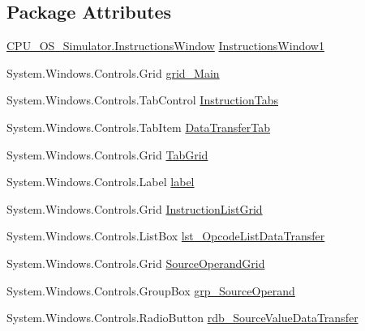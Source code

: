 \subsection*{Package Attributes}
\begin{DoxyCompactItemize}
\item 
\hyperlink{class_c_p_u___o_s___simulator_1_1_instructions_window}{C\+P\+U\+\_\+\+O\+S\+\_\+\+Simulator.\+Instructions\+Window} \hyperlink{class_c_p_u___o_s___simulator_1_1_instructions_window_ab7cd84f5ba064256327f6b1b1cdbc525}{Instructions\+Window1}
\item 
System.\+Windows.\+Controls.\+Grid \hyperlink{class_c_p_u___o_s___simulator_1_1_instructions_window_a83e86d19573c6c56db33e047354169a1}{grid\+\_\+\+Main}
\item 
System.\+Windows.\+Controls.\+Tab\+Control \hyperlink{class_c_p_u___o_s___simulator_1_1_instructions_window_a2e3784c64a40e14586270c1ebfe8bf3d}{Instruction\+Tabs}
\item 
System.\+Windows.\+Controls.\+Tab\+Item \hyperlink{class_c_p_u___o_s___simulator_1_1_instructions_window_a1076ccccc5b00e3f34ad487bc99b509b}{Data\+Transfer\+Tab}
\item 
System.\+Windows.\+Controls.\+Grid \hyperlink{class_c_p_u___o_s___simulator_1_1_instructions_window_a8e5436d90df63837c7f39586855bda1b}{Tab\+Grid}
\item 
System.\+Windows.\+Controls.\+Label \hyperlink{class_c_p_u___o_s___simulator_1_1_instructions_window_a71ce6968170dda46d83aefc71b63a96d}{label}
\item 
System.\+Windows.\+Controls.\+Grid \hyperlink{class_c_p_u___o_s___simulator_1_1_instructions_window_af568f7891b3381f9bec2f0d5b2d0d8c6}{Instruction\+List\+Grid}
\item 
System.\+Windows.\+Controls.\+List\+Box \hyperlink{class_c_p_u___o_s___simulator_1_1_instructions_window_a03052f893a09b459e840597cf98baffc}{lst\+\_\+\+Opcode\+List\+Data\+Transfer}
\item 
System.\+Windows.\+Controls.\+Grid \hyperlink{class_c_p_u___o_s___simulator_1_1_instructions_window_a6e37ff7da499bab3f5b0037d2b4c68cd}{Source\+Operand\+Grid}
\item 
System.\+Windows.\+Controls.\+Group\+Box \hyperlink{class_c_p_u___o_s___simulator_1_1_instructions_window_ace26d2d0e3de3715d755e91ab04a054a}{grp\+\_\+\+Source\+Operand}
\item 
System.\+Windows.\+Controls.\+Radio\+Button \hyperlink{class_c_p_u___o_s___simulator_1_1_instructions_window_a0798a7bfaace0c96650cf9df53fbf6fd}{rdb\+\_\+\+Source\+Value\+Data\+Transfer}

\end{DoxyCompactItemize}
